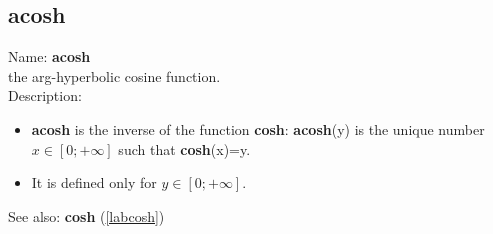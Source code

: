 \subsection{acosh}
\label{labacosh}
\noindent Name: \textbf{acosh}\\
the arg-hyperbolic cosine function.\\
\noindent Description: \begin{itemize}

\item \textbf{acosh} is the inverse of the function \textbf{cosh}: \textbf{acosh}(y) is the unique number 
   $x \in [0; +\infty]$ such that \textbf{cosh}(x)=y.

\item It is defined only for $y \in [0;+\infty]$.
\end{itemize}
See also: \textbf{cosh} (\ref{labcosh})

